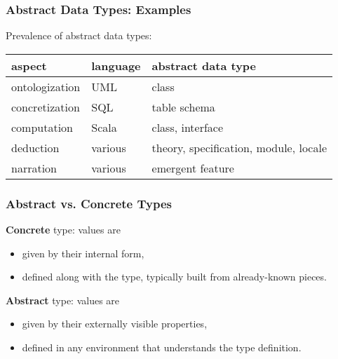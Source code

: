 \begin{frame}\frametitle{Abstract Data Types: Examples}
Prevalence of abstract data types:

\begin{center}
\begin{tabular}{l|ll}
aspect & language & abstract data type \\
\hline
ontologization & UML & class \\
concretization & SQL & table schema \\
computation & Scala & class, interface \\
deduction & various & theory, specification, module, locale \\
narration & various & emergent feature
\end{tabular}
\end{center}

\end{frame}

\begin{frame}\frametitle{Abstract vs. Concrete Types}
\textbf{Concrete} type: values are
\begin{itemize}
\item given by their internal form,
\item defined along with the type, typically built from already-known pieces.
\end{itemize}

\textbf{Abstract} type: values are
\begin{itemize}
\item given by their externally visible properties,
\item defined in any environment that understands the type definition.
\end{itemize}
\end{frame}

